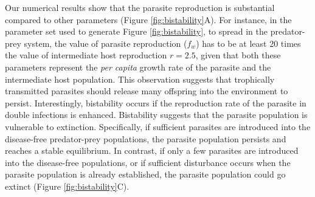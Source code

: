 \documentclass[a4paper]{scrartcl}
\begin{document}
Our numerical results show that the parasite reproduction is substantial compared to other parameters (Figure \ref{fig:bistability}A). 
For instance, in the parameter set used to generate Figure \ref{fig:bistability}, to spread in the predator-prey system, the value of parasite reproduction ($f_w$) has to be at least  20 times the value of intermediate host reproduction $r = 2.5$, given that both these parameters represent the \textit{per capita} growth rate of the parasite and the intermediate host population.
This observation suggests that trophically transmitted parasites should release many offspring into the environment to persist. 
Interestingly, bistability occurs if the reproduction rate of the parasite in double infections is enhanced. 
Bistability suggests that the parasite population is vulnerable to extinction. 
Specifically, if sufficient parasites are introduced into the disease-free predator-prey populations, the parasite population persists and reaches a stable equilibrium. 
In contrast, if only a few parasites are introduced into the disease-free populations, or if sufficient disturbance occurs when the parasite population is already established, the parasite population could go extinct (Figure \ref{fig:bistability}C).
\end{document}
